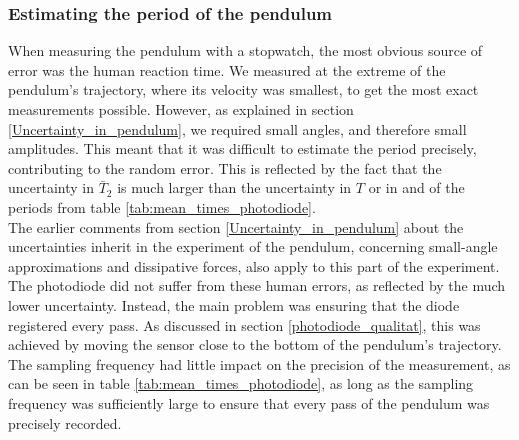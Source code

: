 \documentclass[a4paper, 10pt]{article}
\begin{document}
\subsubsection{Estimating the period of the pendulum}\label{Uncertainty_in_pendulum_period}
When measuring the pendulum with a stopwatch, the most obvious source of error was the human reaction time. We measured at the extreme of the pendulum's trajectory, where its velocity was smallest, to get the most exact measurements possible. However, as explained in section \ref{Uncertainty_in_pendulum}, we required small angles, and therefore small amplitudes. This meant that it was difficult to estimate the period precisely, contributing to the random error. This is reflected by the fact that the uncertainty in $\bar{T}_2$ is much larger than the uncertainty in $T$ or in and of the periods from table \ref{tab:mean_times_photodiode}.\\
\linebreak
The earlier comments from section \ref{Uncertainty_in_pendulum} about the uncertainties inherit in the experiment of the pendulum, concerning small-angle approximations and dissipative forces, also apply to this part of the experiment.\\
\linebreak
The photodiode did not suffer from these human errors, as reflected by the much lower uncertainty. Instead, the main problem was ensuring that the diode registered every pass. As discussed in section \ref{photodiode_qualitat}, this was achieved by moving the sensor close to the bottom of the pendulum's trajectory. The sampling frequency had little impact on the precision of the measurement, as can be seen in table \ref{tab:mean_times_photodiode}, as long as the sampling frequency was sufficiently large to ensure that every pass of the pendulum was precisely recorded.\\
\linebreak
\end{document}

